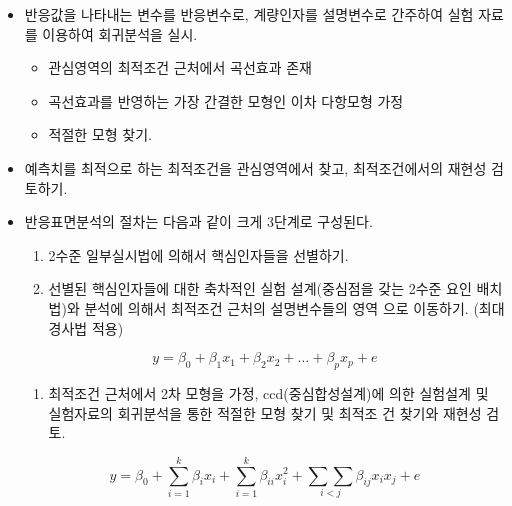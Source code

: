 \documentclass[
]{book}
\providecommand{\tightlist}{%
  \setlength{\itemsep}{0pt}\setlength{\parskip}{0pt}}
\theoremstyle{definition}
\theoremstyle{definition}
\theoremstyle{definition}
\theoremstyle{definition}
\theoremstyle{remark}
\begin{document}
\begin{itemize}
\item
  반응값을 나타내는 변수를 반응변수로, 계량인자를 설명변수로 간주하여 실험 자료를 이용하여 회귀분석을 실시.

  \begin{itemize}
  \tightlist
  \item
    관심영역의 최적조건 근처에서 곡선효과 존재
  \item
    곡선효과를 반영하는 가장 간결한 모형인 이차 다항모형 가정
  \item
    적절한 모형 찾기.
  \end{itemize}
\item
  예측치를 최적으로 하는 최적조건을 관심영역에서 찾고, 최적조건에서의 재현성 검토하기.
\item
  반응표면분석의 절차는 다음과 같이 크게 3단계로 구성된다.

  \begin{enumerate}
  \def\labelenumi{\arabic{enumi}.}
  \item
    2수준 일부실시법에 의해서 핵심인자들을 선별하기.
  \item
    선별된 핵심인자들에 대한 축차적인 실험 설계(중심점을 갖는 2수준 요인 배치법)와 분석에 의해서 최적조건 근처의 설명변수들의 영역 으로 이동하기. (최대경사법 적용)
  \end{enumerate}

  \[ y = \beta_0 + \beta_1 x_1 + \beta_2 x_2 + \dots + \beta_p x_p + e \]

  \begin{enumerate}
  \def\labelenumi{\arabic{enumi}.}
  \setcounter{enumi}{2}
  \tightlist
  \item
    최적조건 근처에서 2차 모형을 가정, ccd(중심합성설계)에 의한 실험설계 및 실험자료의 회귀분석을 통한 적절한 모형 찾기 및 최적조 건 찾기와 재현성 검토.
  \end{enumerate}

  \[  y = \beta_0 + \sum_{i=1}^k \beta_i x_i + \sum_{i=1}^k \beta_{ii} x^2_i + \underset{i<j}{\sum \sum} \beta_{ij} x_i x_j + e \]
\end{itemize}
\end{document}
